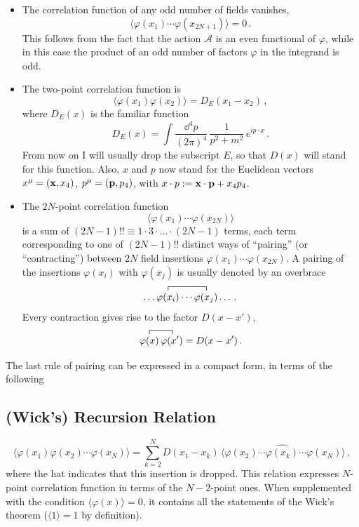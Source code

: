 \begin{itemize}
\item The correlation function of any odd number of fields vanishes,
\[
\bigl\langle\varphi(x_1)\cdots\varphi(x_{2N+1})\bigr\rangle=0\,.
\]
This follows from the fact that the action $\mathcal A$ is an even functional
of $\varphi$, while in this case the product of an odd number of factors
$\varphi$ in the integrand is odd.
\item The two-point correlation function is
\[
\bigl\langle\varphi(x_1)\varphi(x_2)\bigr\rangle=D_E(x_1-x_2)\,,
\]
where $D_E(x)$ is the familiar function
\[
D_E(x)=\int\frac{\dd^4p}{(2\pi)^4}\,\frac1{p^2+m^2}\,e^{ip\cdot x}\,.
\]
From now on I will usually drop the subscript $E$, so that $D(x)$ will stand
for this function. Also, $x$ and $p$ now stand for the Euclidean vectors
$x^\mu=(\mathbf{x},x_4)$, $p^\mu=(\mathbf{p},p_4)$, with $x\cdot p:=\mathbf{x}\cdot\mathbf{p}+x_4p_4$.
\item The $2N$-point correlation function
\[
\bigl\langle\varphi(x_1)\cdots\varphi(x_{2N})\bigr\rangle
\]
is a sum of $(2N-1)!!\equiv1\cdot3\cdot\ldots\cdot(2N-1)$ terms, each term
corresponding to one of $(2N-1)!!$ distinct ways of ``pairing'' (or
``contracting'') between $2N$ field insertions
$\varphi(x_1)\cdots\varphi(x_{2N})$. A pairing of the insertions
$\varphi(x_i)$ with $\varphi(x_j)$ is usually denoted by an overbrace
\[
\dots\contraction{}{\varphi(x_i)}{\cdots}{\varphi(x_j)}\varphi(x_i)\cdots\varphi(x_j)\dots\,.
\]
Every contraction gives rise to the factor $D(x-x')$,
\[
\contraction{}{\varphi(x)}{\,}{\varphi(x')}\varphi(x)\,\varphi(x')=D(x-x')\,.
\]
\end{itemize}
The last rule of pairing can be expressed in a compact form, in terms of the
following

\subsection*{(Wick's) Recursion Relation}
\begin{equation}\label{eq:WickRec}
\bigl\langle\varphi(x_1)\varphi(x_2)\cdots\varphi(x_N)\bigr\rangle
=\sum_{k=2}^ND(x_1-x_k)\,\bigl\langle\varphi(x_2)\cdots\widehat{\varphi(x_k)}\cdots\varphi(x_N)\bigr\rangle\,,
\end{equation}
where the hat indicates that this insertion is dropped. This relation
expresses $N$-point correlation function in terms of the $N-2$-point ones.
When supplemented with the condition $\langle\varphi(x)\rangle=0$, it contains
all the statements of the Wick's theorem ($\langle1\rangle=1$ by definition).

